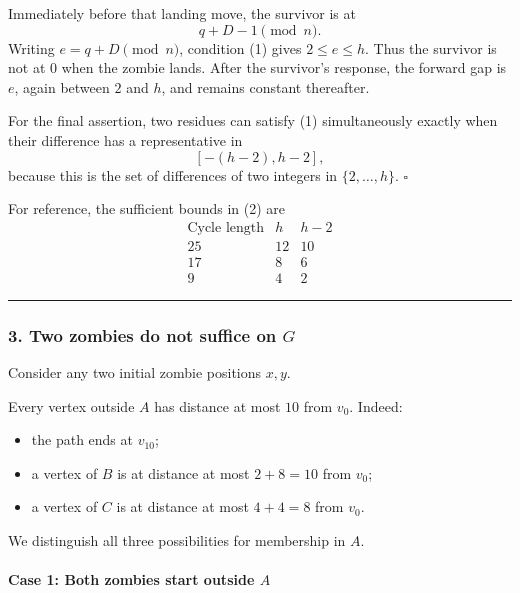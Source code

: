 \documentclass[
  11pt,
  a4paper,
]{article}
\providecommand{\tightlist}{%
  \setlength{\itemsep}{0pt}\setlength{\parskip}{0pt}}
\begin{document}
Immediately before that landing move, the survivor is at \[
q+D-1 \pmod n.
\] Writing \(e=q+D\pmod n\), condition (1) gives \(2\le e\le h\). Thus
the survivor is not at \(0\) when the zombie lands. After the survivor's
response, the forward gap is \(e\), again between \(2\) and \(h\), and
remains constant thereafter.

For the final assertion, two residues can satisfy (1) simultaneously
exactly when their difference has a representative in \[
[-(h-2),h-2],
\] because this is the set of differences of two integers in
\(\{2,\ldots,h\}\). \(\square\)

For reference, the sufficient bounds in (2) are \[
\begin{array}{c|c|c}
\text{Cycle length}&h&h-2\\ \hline
25&12&10\\
17&8&6\\
9&4&2
\end{array}
\]

\begin{center}\rule{0.5\linewidth}{0.5pt}\end{center}

\subsubsection{\texorpdfstring{3. Two zombies do not suffice on
\(G\)}{3. Two zombies do not suffice on G}}\label{two-zombies-do-not-suffice-on-g}

Consider any two initial zombie positions \(x,y\).

Every vertex outside \(A\) has distance at most \(10\) from \(v_0\).
Indeed:

\begin{itemize}
\tightlist
\item
  the path ends at \(v_{10}\);
\item
  a vertex of \(B\) is at distance at most \(2+8=10\) from \(v_0\);
\item
  a vertex of \(C\) is at distance at most \(4+4=8\) from \(v_0\).
\end{itemize}

We distinguish all three possibilities for membership in \(A\).

\paragraph{\texorpdfstring{Case 1: Both zombies start outside
\(A\)}{Case 1: Both zombies start outside A}}\label{case-1-both-zombies-start-outside-a}
\end{document}
